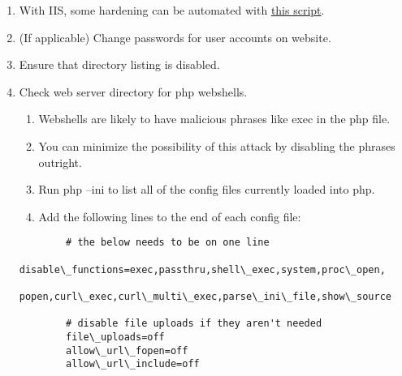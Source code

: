 \documentclass[12pt,letterpaper]{article}
\begin{document}
\begin{enumerate}
	\item With IIS, some hardening can be automated with \href{https://github.com/ufsitblue/blue/blob/main/dsu\_blue/windows/IIS.ps1}{this script}.
	\item (If applicable) Change passwords for user accounts on website.
	\item Ensure that directory listing is disabled.
	\item Check web server directory for php webshells.
	\begin{enumerate}
		\item Webshells are likely to have malicious phrases like exec in the php file.
		\item You can minimize the possibility of this attack by disabling the phrases outright.
		\item Run php --ini to list all of the config files currently loaded into php.
		\item Add the following lines to the end of each config file:
	\end{enumerate}
	{ \color{iris} \begin{verbatim}
		# the below needs to be on one line
		disable\_functions=exec,passthru,shell\_exec,system,proc\_open,
		popen,curl\_exec,curl\_multi\_exec,parse\_ini\_file,show\_source

		# disable file uploads if they aren't needed
		file\_uploads=off
		allow\_url\_fopen=off
		allow\_url\_include=off
		\end{verbatim} }
\end{enumerate}
\end{document}
